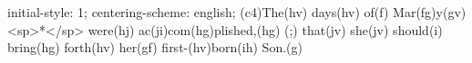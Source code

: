 initial-style: 1;
centering-scheme: english;
(c4)The(hv) days(hv) of(f) Mar(fg)y(gv) <sp>*</sp> were(hj) ac(ji)com(hg)plished,(hg) (;) that(jv) she(jv) should(i) bring(hg) forth(hv) her(gf) first-(hv)born(ih) Son.(g)
